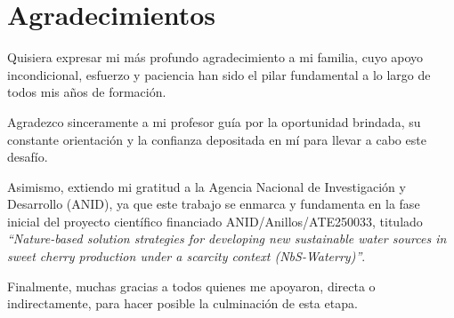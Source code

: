 \chapter*{Agradecimientos}
\label{pag:agradecimientos-ini}

Quisiera expresar mi más profundo agradecimiento a mi familia, cuyo apoyo incondicional, esfuerzo y paciencia han sido el pilar fundamental a lo largo de todos mis años de formación.

Agradezco sinceramente a mi profesor guía por la oportunidad brindada, su constante orientación y la confianza depositada en mí para llevar a cabo este desafío.

Asimismo, extiendo mi gratitud a la Agencia Nacional de Investigación y Desarrollo (ANID), ya que este trabajo se enmarca y fundamenta en la fase inicial del proyecto científico financiado ANID/Anillos/ATE250033, titulado \textit{\enquote{Nature-based solution strategies for developing new sustainable water sources in sweet cherry production under a scarcity context (NbS-Waterry)}}.

Finalmente, muchas gracias a todos quienes me apoyaron, directa o indirectamente, para hacer posible la culminación de esta etapa.
\label{pag:agradecimientos-fin}
